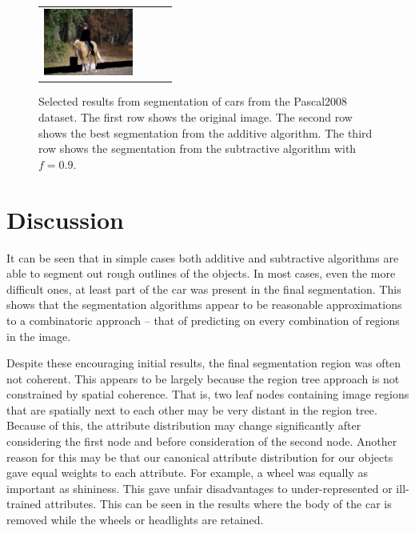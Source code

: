 \documentclass[10pt,twocolumn,letterpaper]{article}
\begin{document}
\begin{figure}[p]
\begin{tabular}{ p{3cm} p{3cm} p{3cm} p{3cm} }
\includegraphics[width=2.95cm]{figures/add_res/horse/2008_004470.jpg_3_bad.jpg.eps} \\
\end{tabular}
\caption{Selected results from segmentation of cars from the Pascal2008
dataset.  The first row shows the original image.  The second row shows
the best segmentation from the additive algorithm.  The third row shows
the segmentation from the subtractive algorithm with $f=0.9$.}
\label{fig:horse_bad_results}
\end{figure}


\section{Discussion}
\label{sec:discussion}
It can be seen that in simple cases both additive and subtractive algorithms
are able to segment out rough outlines of the objects.  In most cases, even
the more difficult ones, at least part of the car was present in the final
segmentation.  This shows that the segmentation algorithms appear to be
reasonable approximations to a combinatoric approach -- that of predicting
on every combination of regions in the image.

Despite these encouraging initial results, the final segmentation region
was often not coherent.
This appears to be largely because the region tree approach is not
constrained by spatial coherence.  That is, two leaf nodes containing image
regions that are spatially next to each other may be very distant in the
region tree.  Because of this, the attribute distribution may change significantly
after considering the first node and before consideration of the second node.
Another reason for this may be that our canonical attribute distribution for
our objects gave equal weights to each attribute.  For example, a wheel was
equally as important as shininess.  This gave unfair disadvantages to
under-represented or ill-trained attributes.  This can be seen in the results
where the body of the car is removed while the wheels or headlights are
retained.
\end{document}
